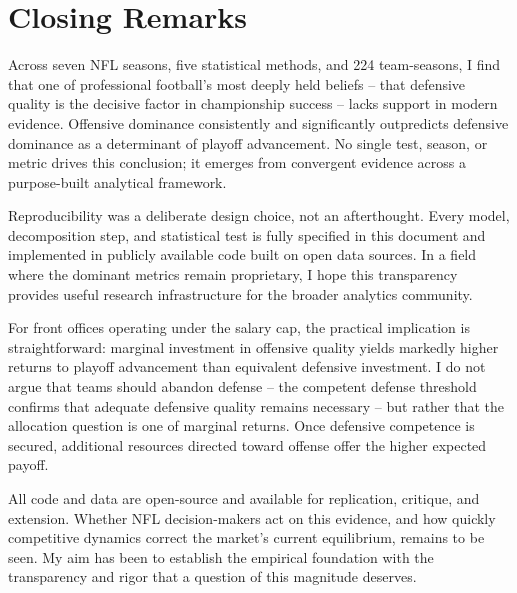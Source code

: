 \section{Closing Remarks}
\label{sec:closing-remarks}

Across seven NFL seasons, five statistical methods, and 224 team-seasons, I find that one of professional football's most deeply held beliefs  -- that defensive quality is the decisive factor in championship success  -- lacks support in modern evidence. Offensive dominance consistently and significantly outpredicts defensive dominance as a determinant of playoff advancement. No single test, season, or metric drives this conclusion; it emerges from convergent evidence across a purpose-built analytical framework.

Reproducibility was a deliberate design choice, not an afterthought. Every model, decomposition step, and statistical test is fully specified in this document and implemented in publicly available code built on open data sources. In a field where the dominant metrics remain proprietary, I hope this transparency provides useful research infrastructure for the broader analytics community.

For front offices operating under the salary cap, the practical implication is straightforward: marginal investment in offensive quality yields markedly higher returns to playoff advancement than equivalent defensive investment. I do not argue that teams should abandon defense  -- the competent defense threshold confirms that adequate defensive quality remains necessary  -- but rather that the allocation question is one of marginal returns. Once defensive competence is secured, additional resources directed toward offense offer the higher expected payoff.

All code and data are open-source and available for replication, critique, and extension. Whether NFL decision-makers act on this evidence, and how quickly competitive dynamics correct the market's current equilibrium, remains to be seen. My aim has been to establish the empirical foundation with the transparency and rigor that a question of this magnitude deserves.
